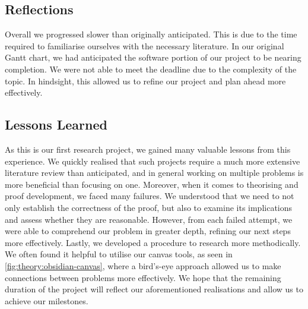\subsection{Reflections}

Overall we progressed slower than originally anticipated. This 
is due to the time required to familiarise ourselves with the necessary
literature.
In our original Gantt chart, we had anticipated the software portion of our project
to be nearing completion. We were not able to meet the deadline due to the complexity
of the topic. In hindsight, this allowed us to refine our project and plan ahead more effectively. 

\subsection{Lessons Learned}

As this is our first research project, we gained many valuable lessons from this experience.
We quickly realised that such projects require a much more extensive literature review than anticipated, 
and in general working on multiple problems is more beneficial than focusing on one.
Moreover, when it comes to theorising and proof development, we faced many failures.
We understood that we need to not only establish the correctness of the proof,
but also to examine its implications and assess whether they are reasonable.
However, from each failed attempt, we were able to comprehend our problem in greater depth,
refining our next steps more effectively.
Lastly, we developed a procedure to research more methodically. We often found it helpful
to utilise our canvas tools, as seen in \ref{fig:theory:obsidian-canvas}, where
a bird's-eye approach allowed us to make connections between problems more effectively.
We hope that the remaining duration of the project will reflect our aforementioned realisations
and allow us to achieve our milestones.


